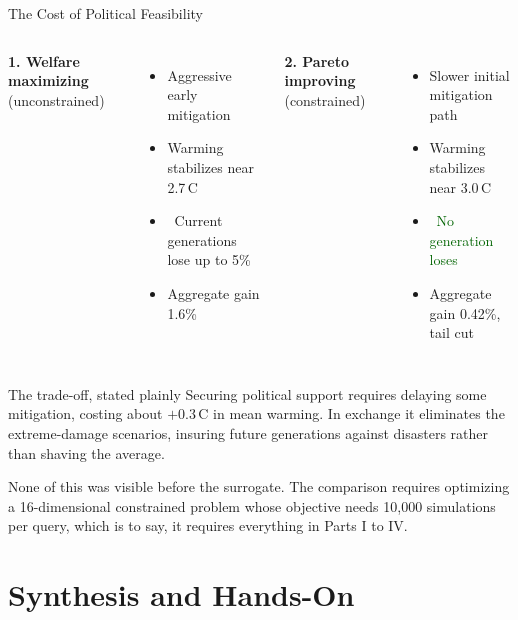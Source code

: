 \documentclass[aspectratio=169,11pt]{beamer}
\newcommand{\emphc}[1]{\textcolor{harvardcrimson}{#1}}
\begin{document}
\begin{frame}{The Cost of Political Feasibility}
\small
\begin{columns}[T]
\textbf{1. Welfare maximizing} (unconstrained)
\begin{itemize}\itemsep2pt
  \item Aggressive early mitigation
  \item Warming stabilizes near \emphc{2.7\,\textdegree C}
  \item \textcolor{harvardcrimson}{~Current generations lose up to 5\%}
  \item Aggregate gain 1.6\%
\end{itemize}
\textbf{2. Pareto improving} (constrained)
\begin{itemize}\itemsep2pt
  \item Slower initial mitigation path
  \item Warming stabilizes near \emphc{3.0\,\textdegree C}
  \item \textcolor{darkgreen}{~No generation loses}
  \item Aggregate gain 0.42\%, tail cut
\end{itemize}
\end{columns}

\vspace{0.3cm}
\begin{alertblock}{The trade-off, stated plainly}
Securing political support requires delaying some mitigation, costing about \emphc{$+0.3$\,\textdegree C} in mean warming. In exchange it eliminates the extreme-damage scenarios, insuring future generations against disasters rather than shaving the average.

\vspace{3pt}
\emphc{None of this was visible before the surrogate.} The comparison requires optimizing a 16-dimensional constrained problem whose objective needs 10{,}000 simulations per query, which is to say, it requires everything in Parts I to IV.
\end{alertblock}
\end{frame}


\section{Synthesis and Hands-On}
\end{document}
